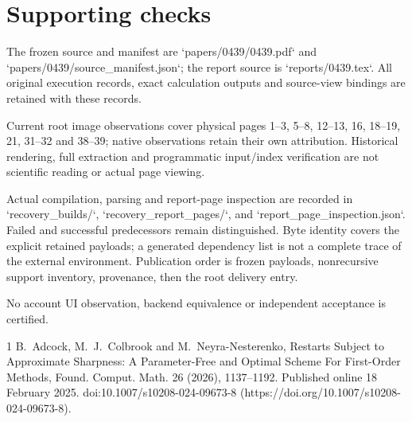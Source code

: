 \documentclass[10pt]{article}
\begin{document}
\section*{Supporting checks}
The frozen source and manifest are `papers/0439/0439.pdf` and `papers/0439/source\_manifest.json`; the report source is `reports/0439.tex`. All original execution records, exact calculation outputs and source-view bindings are retained with these records.\par
Current root image observations cover physical pages 1–3, 5–8, 12–13, 16, 18–19, 21, 31–32 and 38–39; native observations retain their own attribution. Historical rendering, full extraction and programmatic input/index verification are not scientific reading or actual page viewing.\par
Actual compilation, parsing and report-page inspection are recorded in `recovery\_builds/`, `recovery\_report\_pages/`, and `report\_page\_inspection.json`. Failed and successful predecessors remain distinguished. Byte identity covers the explicit retained payloads; a generated dependency list is not a complete trace of the external environment. Publication order is frozen payloads, nonrecursive support inventory, provenance, then the root delivery entry.\par
No account UI observation, backend equivalence or independent acceptance is certified.\par
1 B. Adcock, M. J. Colbrook and M. Neyra-Nesterenko, Restarts Subject to Approximate Sharpness: A Parameter-Free and Optimal Scheme For First-Order Methods, Found. Comput. Math. 26 (2026), 1137–1192. Published online 18 February 2025. doi:10.1007/s10208-024-09673-8 (https://doi.org/10.1007/s10208-024-09673-8).\par
\end{document}
